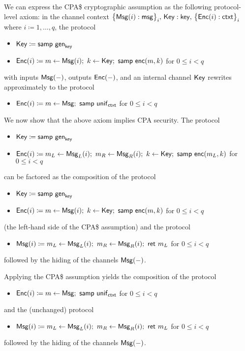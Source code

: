 We can express the CPA\$ cryptographic assumption as the following protocol-level axiom: in the channel context $\big\{\mathsf{Msg}(i) : \mathsf{msg}\big\}_i, \, \mathsf{Key} : \mathsf{key}, \, \big\{\mathsf{Enc}(i) : \mathsf{ctxt}\big\}_i$ where $i \coloneqq 1,\dots,q$, the protocol
\begin{itemize}
\item $\mathsf{Key} \coloneqq \mathsf{samp} \ \mathsf{gen}_{\mathsf{key}}$
\item $\mathsf{Enc}(i) \coloneqq m \leftarrow \mathsf{Msg}(i); \ k \leftarrow \mathsf{Key}; \ \mathsf{samp} \ \mathsf{enc}(m,k)$ for $0 \leq i < q$
\end{itemize}
with inputs $\mathsf{Msg}(-)$, outputs $\mathsf{Enc}(-)$, and an internal channel $\mathsf{Key}$ rewrites approximately to the protocol
\begin{itemize}
\item $\Enc(i) \coloneqq m \leftarrow \Msg; \ \samp{\unif_\ctxt}$ for $0 \leq i < q$
\end{itemize}
We now show that the above axiom implies CPA security. The protocol
\begin{itemize}
\item $\mathsf{Key} \coloneqq \mathsf{samp} \ \mathsf{gen}_{\mathsf{key}}$
\item $\Enc(i) \coloneqq m_L \leftarrow \MsgL(i); \ m_R \leftarrow \MsgR(i); \ k \leftarrow \Key; \ \samp{\enc(m_L,k)}$ for $0 \leq i < q$
\end{itemize}
can be factored as the composition of the protocol
\begin{itemize}
\item $\mathsf{Key} \coloneqq \mathsf{samp} \ \mathsf{gen}_{\mathsf{key}}$
\item $\mathsf{Enc}(i) \coloneqq m \leftarrow \mathsf{Msg}(i); \ k \leftarrow \mathsf{Key}; \ \mathsf{samp} \ \mathsf{enc}(m,k)$ for $0 \leq i < q$
\end{itemize}
(the left-hand side of the CPA\$ assumption) and the protocol
\begin{itemize}
\item $\mathsf{Msg}(i) \coloneqq m_L \leftarrow \mathsf{Msg}_L(i); \ m_R \leftarrow \mathsf{Msg}_R(i); \ \mathsf{ret} \ m_L$ for $0 \leq i < q$
\end{itemize}
followed by the hiding of the channels $\mathsf{Msg}(-)$.

Applying the CPA\$ assumption yields the composition of the protocol
\begin{itemize}
\item $\Enc(i) \coloneqq m \leftarrow \Msg; \ \samp{\unif_\ctxt}$ for $0 \leq i < q$
\end{itemize}
and the (unchanged) protocol
\begin{itemize}
\item $\mathsf{Msg}(i) \coloneqq m_L \leftarrow \mathsf{Msg}_L(i); \ m_R \leftarrow \mathsf{Msg}_R(i); \ \mathsf{ret} \ m_L$ for $0 \leq i < q$
\end{itemize}
followed by the hiding of the channels $\mathsf{Msg}(-)$.

